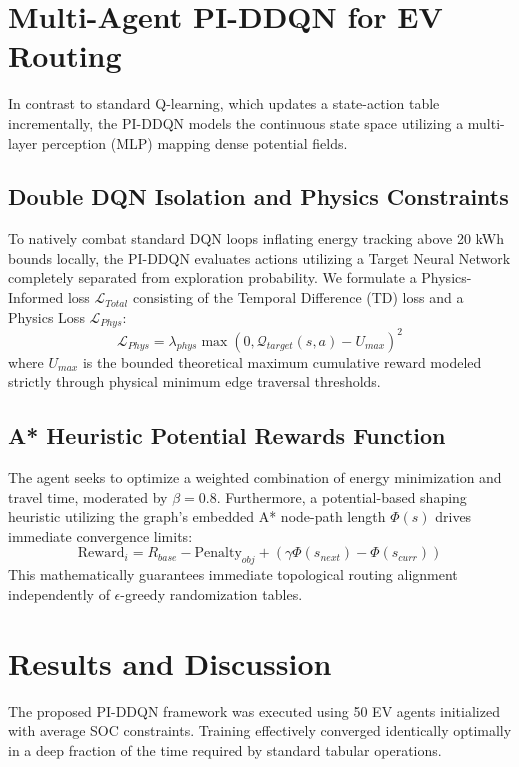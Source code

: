 \documentclass[journal]{IEEEtran}
\begin{document}
\section{Multi-Agent PI-DDQN for EV Routing}
In contrast to standard Q-learning, which updates a state-action table incrementally, the PI-DDQN models the continuous state space utilizing a multi-layer perception (MLP) mapping dense potential fields.

\subsection{Double DQN Isolation and Physics Constraints}
To natively combat standard DQN loops inflating energy tracking above 20 kWh bounds locally, the PI-DDQN evaluates actions utilizing a Target Neural Network completely separated from exploration probability. We formulate a Physics-Informed loss $\mathcal{L}_{Total}$ consisting of the Temporal Difference (TD) loss and a Physics Loss $\mathcal{L}_{Phys}$:
\begin{equation}
\mathcal{L}_{Phys} = \lambda_{phys} \max(0, \mathcal{Q}_{target}(s,a) - U_{max})^2
\end{equation}
where $U_{max}$ is the bounded theoretical maximum cumulative reward modeled strictly through physical minimum edge traversal thresholds. 

\subsection{A* Heuristic Potential Rewards Function}
The agent seeks to optimize a weighted combination of energy minimization and travel time, moderated by $\beta=0.8$. Furthermore, a potential-based shaping heuristic utilizing the graph's embedded A* node-path length $\Phi(s)$ drives immediate convergence limits:
\begin{equation}
\text{Reward}_i = R_{base} - \text{Penalty}_{obj} + \left( \gamma \Phi(s_{next}) - \Phi(s_{curr}) \right)
\end{equation}
This mathematically guarantees immediate topological routing alignment independently of $\epsilon$-greedy randomization tables.

\section{Results and Discussion}
The proposed PI-DDQN framework was executed using 50 EV agents initialized with average SOC constraints. Training effectively converged identically optimally in a deep fraction of the time required by standard tabular operations.
\end{document}
